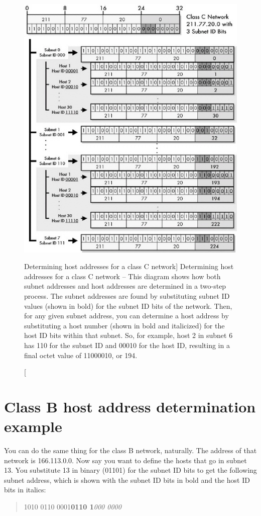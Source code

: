 \begin{figure}
   \centering
   \includegraphics[width=.9\textwidth]{images/class-c-host-addresses.jpg}
   \caption
      [Determining host addresses for a class C network]
      {Determining host addresses for a class C network --
      This diagram shows how both subnet addresses and host addresses are determined in a two-step process.
      The subnet addresses are found by substituting subnet ID values (shown in bold) for the subnet ID bits of the network.
      Then, for any given subnet address, you can determine a host address by substituting a host number (shown in bold and italicized)
      for the host ID bits within that subnet.
      So, for example, host 2 in subnet 6 has 110 for the subnet ID and 00010 for the host ID, resulting in a final octet value of 11000010, or 194.}
   \label{fig:class-c-host-addresses}
\end{figure}


\section{Class B host address determination example}

You can do the same thing for the class B network, naturally.
The address of that network is 166.113.0.0.
Now say you want to define the hosts that go in subnet 13.
You substitute 13 in binary (01101) for the subnet ID bits to get the following subnet address,
which is shown with the subnet ID bits in bold and the host ID bits in italics:
\begin{quote}
1010 0110 0001\quad \textbf{0110 1}\textit{000 0000}
\end{quote}

